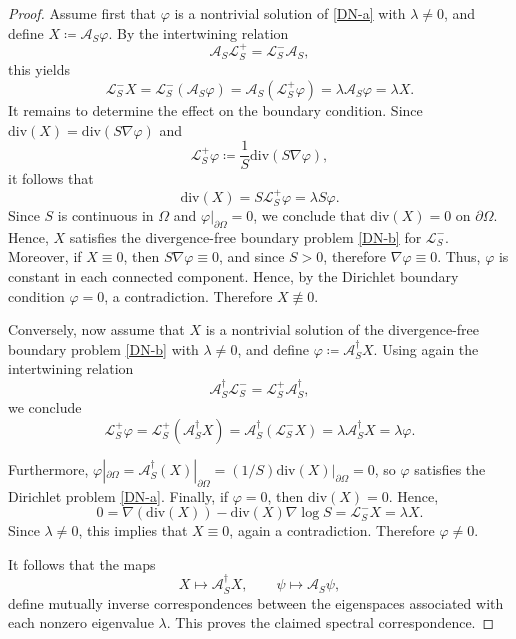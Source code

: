 \documentclass[10pt,a4paper]{amsart}
\newcommand{\diver}{{{\mathrm{div}}}}
\begin{document}
\begin{proof}
Assume first that $\varphi$ is a nontrivial solution of \eqref{DN-a} with $\lambda \neq 0$, and define $X \coloneq \mathcal A_S\varphi$. By the intertwining relation
\[
\mathcal A_S\mathscr L_S^{+} = \mathscr L_S^{-}\mathcal A_S,
\]
this yields
\[
\mathscr L_S^{-}X
= \mathscr L_S^{-}(\mathcal A_S\varphi)
= \mathcal A_S(\mathscr L_S^{+}\varphi)
= \lambda \mathcal A_S\varphi
= \lambda X.
\]
It remains to determine the effect on the boundary condition. Since $\diver(X)= \diver(S\nabla\varphi)$ and
\[
\mathscr{L}_S^{+} \varphi \coloneqq \dfrac{1}{S}\diver\left({S}\nabla\varphi \right),
\]
it follows that
\[
\diver(X) = S\mathscr L_S^{+}\varphi = \lambda S\varphi.
\]
Since $S$ is continuous in $\Omega$ and $\varphi|_{\partial \Omega}=0$, we conclude that $\diver(X)=0$ on $\partial \Omega$. Hence, $X$ satisfies the divergence-free boundary problem \eqref{DN-b} for $\mathscr L_S^{-}$. Moreover, if $X \equiv 0$, then $S \nabla\varphi\equiv 0$, and since $S>0$, therefore $\nabla \varphi\equiv 0$. Thus, $\varphi$ is constant in each connected component. Hence, by the Dirichlet boundary condition $\varphi = 0$, a contradiction. Therefore $X \not\equiv 0$.

Conversely, now assume that $X$ is a nontrivial solution of the divergence-free boundary problem \eqref{DN-b} with $\lambda \neq 0$, and define $\varphi \coloneq \mathcal{A}^\dag_SX$. Using again the intertwining relation
\[
\mathcal{A}^\dag_S\mathscr{L}_S^{-} = \mathscr{L}_S^{+}\mathcal{A}^\dag_S,
\]
we conclude
\[
\mathscr L_S^{+}\varphi = \mathscr L_S^{+}(\mathcal A^\dag_SX) = \mathcal A^\dag_S(\mathscr L_S^{-}X) =\lambda \mathcal{A}^\dag_SX = \lambda\varphi.
\]

Furthermore, $\varphi|_{\partial \Omega}= \mathcal{A}^\dag_S (X)|_{\partial \Omega} = (1/S) \diver(X)|_{\partial \Omega} = 0$, so $\varphi$ satisfies the Dirichlet problem \eqref{DN-a}. Finally, if $\varphi = 0$, then $\diver(X)=0$. Hence,
\[
0= \nabla\left( \diver(X) \right) - \diver(X) \nabla \log S =\mathscr L_S^{-}X= \lambda X.
\]
Since $\lambda \neq 0$, this implies that $X \equiv 0$, again a contradiction. Therefore $\varphi \neq 0$.

It follows that the maps
\[
X\mapsto \mathcal A_S^\dag X,
\qquad
\psi\mapsto \mathcal A_S\psi,
\]
define mutually inverse correspondences between the eigenspaces associated with each nonzero eigenvalue $\lambda$. This proves the claimed spectral correspondence.
\end{proof}
\end{document}
